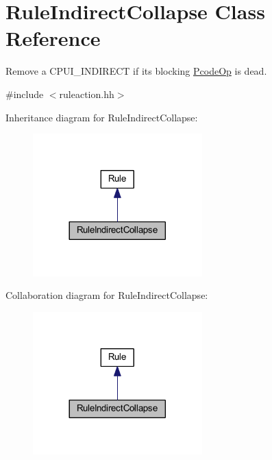\hypertarget{class_rule_indirect_collapse}{}\section{Rule\+Indirect\+Collapse Class Reference}
\label{class_rule_indirect_collapse}


Remove a C\+P\+U\+I\+\_\+\+I\+N\+D\+I\+R\+E\+CT if its blocking \mbox{\hyperlink{class_pcode_op}{Pcode\+Op}} is dead.  




{\ttfamily \#include $<$ruleaction.\+hh$>$}



Inheritance diagram for Rule\+Indirect\+Collapse\+:
\nopagebreak
\begin{figure}[H]
\begin{center}
\leavevmode
\includegraphics[width=185pt]{class_rule_indirect_collapse__inherit__graph}
\end{center}
\end{figure}


Collaboration diagram for Rule\+Indirect\+Collapse\+:
\nopagebreak
\begin{figure}[H]
\begin{center}
\leavevmode
\includegraphics[width=185pt]{class_rule_indirect_collapse__coll__graph}
\end{center}
\end{figure}
